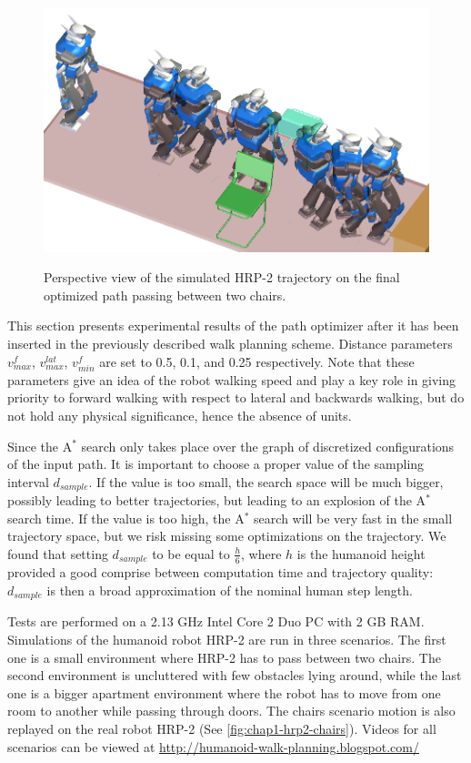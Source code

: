 \begin{figure}
  \centering
      {\includegraphics[width = \linewidth]
        {src/chap1-path-optimization/chairs-hash-optim-perspective-hrp2.png}}
      \caption{Perspective view of the simulated HRP-2 trajectory on
        the final optimized path passing between two chairs.}
      \label{fig:chap1-chairs-hash-optim-perspective-hrp2}
\end{figure}

This section presents experimental results of the path optimizer after
it has been inserted in the previously described walk planning
scheme. Distance parameters $v_{max}^f$, $v_{max}^{lat}$, $v_{min}^f$
are set to 0.5, 0.1, and 0.25 respectively. Note that these parameters
give an idea of the robot walking speed and play a key role in giving
priority to forward walking with respect to lateral and backwards
walking, but do not hold any physical significance, hence the absence
of units.

Since the A$^{*}$ search only takes place over the graph of discretized
configurations of the input path. It is important to choose a proper
value of the sampling interval $d_{sample}$. If the value is too
small, the search space will be much bigger, possibly leading to
better trajectories, but leading to an explosion of the A$^{*}$ search
time. If the value is too high, the A$^{*}$ search will be very fast in the
small trajectory space, but we risk missing some optimizations on the
trajectory. We found that setting $d_{sample}$ to be equal to
$\frac{h}{6}$, where $h$ is the humanoid height provided a good
comprise between computation time and trajectory quality: $d_{sample}$
is then a broad approximation of the nominal human step length.

Tests are performed on a 2.13 GHz Intel Core 2 Duo PC with 2 GB RAM.
Simulations of the humanoid robot HRP-2 are run in three scenarios.
The first one is a small environment where HRP-2 has to pass between
two chairs. The second environment is uncluttered with few obstacles
lying around, while the last one is a bigger apartment environment
where the robot has to move from one room to another while passing
through doors. The chairs scenario motion is also replayed on the real
robot HRP-2 (See \autoref{fig:chap1-hrp2-chairs}). Videos for all
scenarios can be viewed at
\url{http://humanoid-walk-planning.blogspot.com/}

